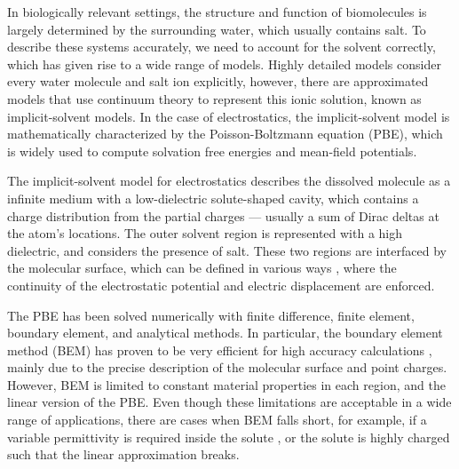 In biologically relevant settings, the structure and function of biomolecules is largely determined by the surrounding water, which usually contains salt. 
To describe these systems accurately, we need to account for the solvent correctly, which has given rise to a wide range of models.\cite{onufriev2018water}
Highly detailed models consider every water molecule and salt ion explicitly, however, there are approximated models that use continuum theory to represent this ionic solution, known as implicit-solvent models.\cite{RouxSimonson1999,DecherchiETal2015}
In the case of electrostatics, the implicit-solvent model is mathematically characterized by the Poisson-Boltzmann equation (PBE)\cite{Baker2004,Bardhan2012}, which is widely used to compute solvation free energies and mean-field potentials.

The implicit-solvent model for electrostatics describes the dissolved molecule as a infinite medium with a low-dielectric solute-shaped cavity, which contains a charge distribution from the partial charges --- usually a sum of Dirac deltas at the atom's locations.
The outer solvent region is represented with a high dielectric, and considers the presence of salt.
These two regions are interfaced by the molecular surface, which can be defined in various ways \cite{HarrisBoschitcshFenley2013}, where the continuity of the electrostatic potential and electric displacement are enforced.

The PBE has been solved numerically with finite difference\cite{BakerETal2001,GilsonETal1985,JurrusETal2018,LiETal2019}, finite element\cite{HolstETal2012,BondEtal2010}, boundary element\cite{boschitsch2002fast,LuETal2006,AltmanBardhanWhiteTidor09,bajaj2011efficient,GengKrasny2013,CooperBardhanBarba2014}, and analytical\cite{YapHeadgordon2010,FelbergETal2017} methods.
In particular, the boundary element method (BEM) has proven to be very efficient for high accuracy calculations \cite{GengKrasny2013,CooperBardhanBarba2014}, mainly due to the precise description of the molecular surface and point charges. 
However, BEM is limited to constant material properties in each region, and the linear version of the PBE. 
Even though these limitations are acceptable in a wide range of applications, there are cases when BEM falls short, for example, if a variable permittivity is required inside the solute \cite{grant2001smooth,li2013dielectric}, or the solute is highly charged such that the linear approximation breaks\cite{FogolariETal1999}.

